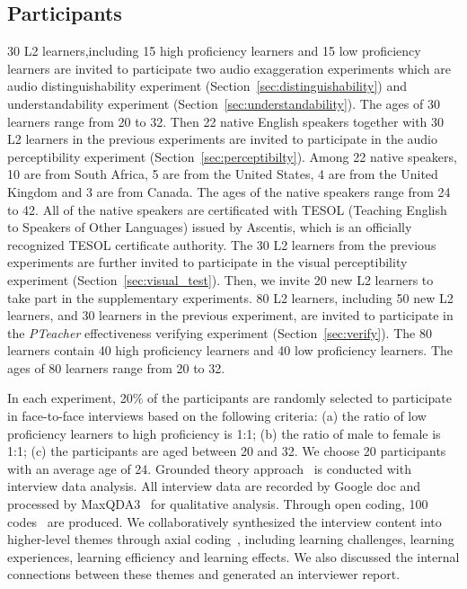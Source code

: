 \documentclass[sigconf]{acmart}
\begin{document}
\subsection[Participants]{Participants}
30 L2 learners,including 15 high proficiency learners and 15 low proficiency learners are invited to participate two audio exaggeration experiments which are audio distinguishability experiment (Section~\ref{sec:distinguishability}) and understandability experiment (Section~\ref{sec:understandability}). %
The ages of 30 learners range from 20 to 32. %
Then 22 native English speakers together with 30 L2 learners in the previous experiments are invited to participate in the audio perceptibility experiment (Section~\ref{sec:perceptibilty}). %
Among 22 native speakers,
10 are from South Africa,
5 are from the United States,
4 are from the United Kingdom
and 3 are from Canada. %
The ages of the native speakers range from 24 to 42. %
All of the native speakers are certificated with TESOL (Teaching English to Speakers of Other Languages) issued by Ascentis, which is an officially recognized TESOL certificate authority. %
%
The 30 L2 learners from the previous experiments are further invited to participate in the visual perceptibility experiment (Section~\ref{sec:visual_test}). %
Then, we invite 20 new L2 learners to take part in the supplementary experiments.
%
80 L2 learners, including 50 new L2 learners, and 30 learners in the previous experiment, are invited to participate in the \textit{PTeacher} effectiveness verifying experiment (Section~\ref{sec:verify}). %
The 80 learners contain 40 high proficiency learners and 40 low proficiency learners. %
The ages of 80 learners range from 20 to 32. %

In each experiment, 20\% of the participants are randomly selected to participate in face-to-face interviews based on the following criteria: (a) the ratio of low proficiency learners to high proficiency is 1:1; (b) the ratio of male to female is 1:1; (c) the participants are aged between 20 and 32. We choose 20 participants with an average age of 24. %
Grounded theory approach~\cite{corbin2014basics} is conducted with interview data analysis.
All interview data are recorded by Google doc and processed by MaxQDA3~\cite{oliveira2013thematic} for qualitative analysis.
Through open coding, 100 codes~\cite{liu2019bought} are produced.
We collaboratively synthesized the interview content into higher-level themes through axial coding~\cite{liu2019bought}, including learning challenges, learning experiences, learning efficiency and learning effects.
We also discussed the internal connections between these themes and generated an interviewer report.
\end{document}
